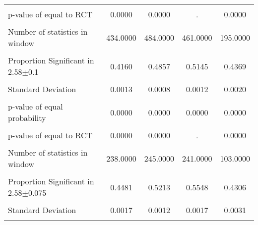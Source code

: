 {\begin{tabular}{l*{4}{c}}
                &                  &                  &                  &                  \\
p-value of equal to RCT&   0.0000         &   0.0000         &        .         &   0.0000         \\
                &                  &                  &                  &                  \\
Number of statistics in window& 434.0000         & 484.0000         & 461.0000         & 195.0000         \\
                &                  &                  &                  &                  \\
\hline Proportion Significant in 2.58$\pm$0.1&   0.4160         &   0.4857         &   0.5145         &   0.4369         \\
                &                  &                  &                  &                  \\
Standard Deviation&   0.0013         &   0.0008         &   0.0012         &   0.0020         \\
                &                  &                  &                  &                  \\
p-value of equal probability&   0.0000         &   0.0000         &   0.0000         &   0.0000         \\
                &                  &                  &                  &                  \\
p-value of equal to RCT&   0.0000         &   0.0000         &        .         &   0.0000         \\
                &                  &                  &                  &                  \\
Number of statistics in window& 238.0000         & 245.0000         & 241.0000         & 103.0000         \\
                &                  &                  &                  &                  \\
\hline Proportion Significant in 2.58$\pm$0.075&   0.4481         &   0.5213         &   0.5548         &   0.4306         \\
                &                  &                  &                  &                  \\
Standard Deviation&   0.0017         &   0.0012         &   0.0017         &   0.0031         \\
                &                  &                  &                  &                  \\

\end{tabular}}
